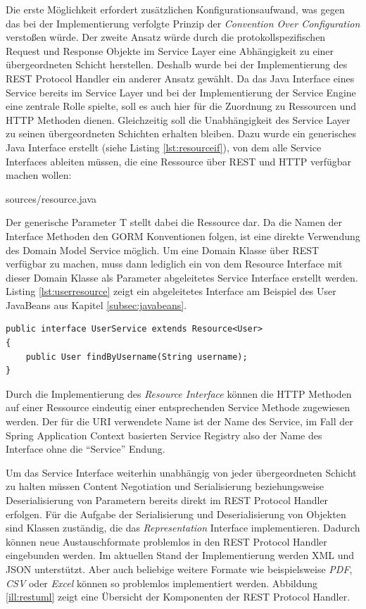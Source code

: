 Die erste Möglichkeit erfordert zusätzlichen Konfigurationsaufwand, was gegen das
bei der Implementierung verfolgte Prinzip der \emph{Convention Over
Configuration} verstoßen würde. Der zweite Ansatz würde durch die
protokollspezifischen Request und Response Objekte im Service Layer eine
Abhängigkeit zu einer übergeordneten Schicht herstellen. Deshalb wurde bei der
Implementierung des \ac{REST} Protocol Handler ein anderer Ansatz gewählt. Da das
Java Interface eines Service bereits im Service Layer und bei der Implementierung
der Service Engine eine zentrale Rolle spielte, soll es auch hier für die
Zuordnung zu Ressourcen und \ac{HTTP} Methoden dienen. Gleichzeitig soll die
Unabhängigkeit des Service Layer zu seinen übergeordneten Schichten erhalten
bleiben. Dazu wurde ein generisches Java Interface erstellt (siehe Listing
\ref{lst:resourceif}), von dem alle Service Interfaces ableiten müssen, die eine
Ressource über \ac{REST} und \ac{HTTP} verfügbar machen wollen:

\lstset{language=Java}
 {sources/resource.java}

Der generische Parameter T stellt dabei die Ressource dar. Da die Namen der
Interface Methoden den \ac{GORM} Konventionen folgen, ist eine direkte Verwendung
des Domain Model Service möglich. Um eine Domain Klasse über \ac{REST} verfügbar
zu machen, muss dann lediglich ein von dem Resource Interface mit dieser Domain
Klasse als Parameter abgeleitetes Service Interface erstellt werden. Listing
\ref{lst:userresource} zeigt ein abgeleitetes Interface am Beispiel des User
JavaBeans aus Kapitel \ref{subsec:javabeans}.

\begin{lstlisting}[caption=Von Resource abgeleitetes UserService Interface,
label=lst:userresource]
public interface UserService extends Resource<User>
{
	public User findByUsername(String username);
}
\end{lstlisting}

Durch die Implementierung des \emph{Resource Interface} können die \ac{HTTP}
Methoden auf einer Ressource eindeutig einer entsprechenden Service Methode
zugewiesen werden. Der für die \ac{URI} verwendete Name ist der Name des Service,
im Fall der Spring Application Context basierten Service Registry also der Name
des Interface ohne die "`Service"' Endung.

Um das Service Interface weiterhin unabhängig von jeder übergeordneten Schicht zu
halten müssen Content Negotiation und Serialisierung beziehungsweise
Deserialisierung von Parametern bereits direkt im \ac{REST} Protocol Handler
erfolgen. Für die Aufgabe der Serialisierung und Deserialisierung von Objekten
sind Klassen zuständig, die das \emph{Representation} Interface implementieren.
Dadurch können neue Austauschformate problemlos in den \ac{REST} Protocol Handler
eingebunden werden. Im aktuellen Stand der Implementierung werden \ac{XML} und
\ac{JSON} unterstützt. Aber auch beliebige weitere Formate wie beispielsweise
\emph{PDF}, \emph{CSV} oder \emph{Excel} können so problemlos implementiert
werden. Abbildung \ref{ill:restuml} zeigt eine Übersicht der Komponenten der
\ac{REST} Protocol Handler.

